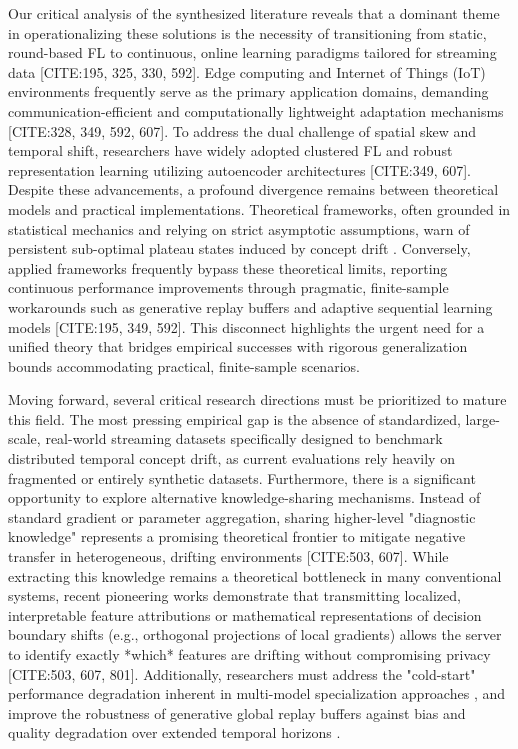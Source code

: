 \documentclass[journal]{IEEEtran}
\begin{document}
Our critical analysis of the synthesized literature reveals that a dominant theme in operationalizing these solutions is the necessity of transitioning from static, round-based FL to continuous, online learning paradigms tailored for streaming data [CITE:195, 325, 330, 592]. Edge computing and Internet of Things (IoT) environments frequently serve as the primary application domains, demanding communication-efficient and computationally lightweight adaptation mechanisms [CITE:328, 349, 592, 607]. To address the dual challenge of spatial skew and temporal shift, researchers have widely adopted clustered FL \cite{Liu2025} and robust representation learning utilizing autoencoder architectures [CITE:349, 607]. Despite these advancements, a profound divergence remains between theoretical models and practical implementations. Theoretical frameworks, often grounded in statistical mechanics and relying on strict asymptotic assumptions, warn of persistent sub-optimal plateau states induced by concept drift \cite{Straat2018}. Conversely, applied frameworks frequently bypass these theoretical limits, reporting continuous performance improvements through pragmatic, finite-sample workarounds such as generative replay buffers and adaptive sequential learning models [CITE:195, 349, 592]. This disconnect highlights the urgent need for a unified theory that bridges empirical successes with rigorous generalization bounds accommodating practical, finite-sample scenarios.

Moving forward, several critical research directions must be prioritized to mature this field. The most pressing empirical gap is the absence of standardized, large-scale, real-world streaming datasets specifically designed to benchmark distributed temporal concept drift, as current evaluations rely heavily on fragmented or entirely synthetic datasets. Furthermore, there is a significant opportunity to explore alternative knowledge-sharing mechanisms. Instead of standard gradient or parameter aggregation, sharing higher-level "diagnostic knowledge" represents a promising theoretical frontier to mitigate negative transfer in heterogeneous, drifting environments [CITE:503, 607]. While extracting this knowledge remains a theoretical bottleneck in many conventional systems, recent pioneering works demonstrate that transmitting localized, interpretable feature attributions or mathematical representations of decision boundary shifts (e.g., orthogonal projections of local gradients) allows the server to identify exactly *which* features are drifting without compromising privacy [CITE:503, 607, 801]. Additionally, researchers must address the "cold-start" performance degradation inherent in multi-model specialization approaches \cite{Jothimurugesan2022}, and improve the robustness of generative global replay buffers against bias and quality degradation over extended temporal horizons \cite{Miao2025}.
\end{document}
